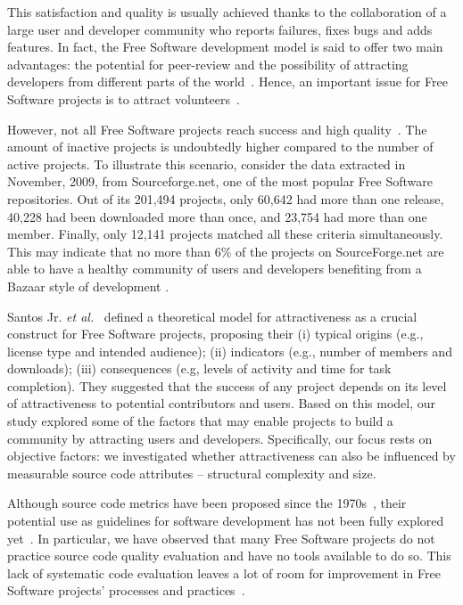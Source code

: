 \documentclass[conference]{IEEEtran}
\begin{document}
This satisfaction and quality is usually achieved thanks to the collaboration
of a large user and developer community who reports failures,
fixes bugs and adds features.
%
In fact, the Free Software development model is said to offer two main advantages:
the potential for peer-review and the possibility of attracting developers
from different parts of the world~\cite{Michlmayr2005}.
%
Hence, an important issue for Free Software projects is to attract volunteers~\cite{Stewart2006}.

However, not all Free Software projects reach success and high quality~\cite{Michlmayr2005}.
The amount of inactive projects is undoubtedly higher compared to the number of active projects.
%
To illustrate this scenario, consider the data extracted in November, 2009,
from Sourceforge.net, one of the most popular Free Software repositories.
Out of its 201,494 projects, only 60,642 had more than one
release, 40,228 had been downloaded more than once, and 23,754 had more than one member.
%
Finally, only 12,141 projects matched all these criteria simultaneously.
This may indicate that no more than 6\% of the projects on
SourceForge.net are able to have a healthy community of users
and developers benefiting from a Bazaar style of development
\cite{CatedralBazzar}.

Santos Jr. \emph{et al.}~\cite{Santos2010} defined a theoretical model for
attractiveness as a crucial construct for Free Software projects, proposing their
(i) typical origins (e.g., license type and intended audience);
(ii) indicators (e.g., number of members and downloads);
(iii) consequences (e.g, levels of activity and time for task completion).
%
They suggested that the success of any project depends on
its level of attractiveness to potential contributors and users.
%
Based on this model, our study explored some of the factors that may enable
projects to build a community by attracting users and developers.
%
Specifically, our focus rests on objective factors: we investigated whether
attractiveness can also be influenced by measurable source code attributes
-- structural complexity and size.

Although source code metrics have been proposed since the 1970s~\cite{SEI88},
their potential use as guidelines for software development has not
been fully explored yet~\cite{Tempero}.
%
In particular, we have observed that many Free Software projects do not practice
source code quality evaluation and have no tools available to do so.
%
This lack of systematic code evaluation leaves a lot of room for improvement
in Free Software projects' processes and practices~\cite{Michlmayr2005}.
\end{document}
